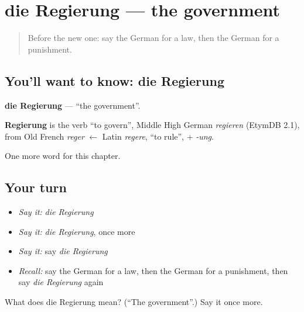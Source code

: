 \section[die Regierung]{die Regierung — the government}

\label{lesson:GE-C208-regierung}



\begin{quote}
Before the new one: say the German for a law, then the German for a punishment.
\end{quote}

\subsection*{You'll want to know: die Regierung}
\textbf{die Regierung} — \textquotedblleft{}the government\textquotedblright{}.

\begin{cousinweb}
\textbf{Regierung} is the verb \textquotedblleft{}to govern\textquotedblright{}, Middle High German \emph{regieren} (EtymDB 2.1), from Old French \emph{reger} $\leftarrow$ Latin \emph{regere}, \textquotedblleft{}to rule\textquotedblright{}, + \emph{-ung}.
\end{cousinweb}

\begin{grammarlens}[title={What you've built}]
One more word for this chapter.
\end{grammarlens}

\subsection*{Your turn}
\begin{itemize}
\raggedright
  \item \emph{Say it:} \emph{die Regierung}
  \item \emph{Say it:} \emph{die Regierung}, once more
  \item \emph{Say it:} say \emph{die Regierung}
  \item \emph{Recall:} say the German for a law, then the German for a punishment, then say \emph{die Regierung} again
\end{itemize}

\begin{tcolorbox}[breakable,colback=teal!4,colframe=teal!35!black,title={Before you move on}]
What does die Regierung mean? (\textquotedblleft{}The government\textquotedblright{}.) Say it once more.
\end{tcolorbox}
